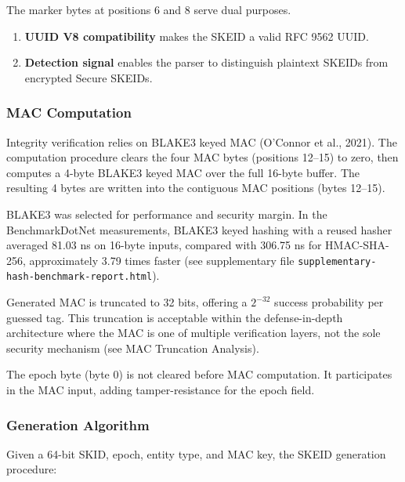 \documentclass[fleqn,10pt]{wlpeerj}
\providecommand{\tightlist}{%
  \setlength{\itemsep}{0pt}\setlength{\parskip}{0pt}}
\begin{document}
The marker bytes at positions 6 and 8 serve dual purposes.

\begin{enumerate}
\def\labelenumi{\arabic{enumi}.}
\tightlist
\item
  \textbf{UUID V8 compatibility} makes the SKEID a valid RFC 9562 UUID.
\item
  \textbf{Detection signal} enables the parser to distinguish plaintext
  SKEIDs from encrypted Secure SKEIDs.
\end{enumerate}

\subsubsection{MAC Computation}\label{mac-computation}

Integrity verification relies on BLAKE3 keyed MAC (O'Connor et al.,
2021). The computation procedure clears the four MAC bytes (positions
12--15) to zero, then computes a 4-byte BLAKE3 keyed MAC over the full
16-byte buffer. The resulting 4 bytes are written into the contiguous
MAC positions (bytes 12--15).

BLAKE3 was selected for performance and security margin. In the
BenchmarkDotNet measurements, BLAKE3 keyed hashing with a reused hasher
averaged 81.03 ns on 16-byte inputs, compared with 306.75 ns for
HMAC-SHA-256, approximately 3.79 times faster (see supplementary file
\texttt{supplementary-hash-benchmark-report.html}).

Generated MAC is truncated to 32 bits, offering a \(2^{-32}\) success
probability per guessed tag. This truncation is acceptable within the
defense-in-depth architecture where the MAC is one of multiple
verification layers, not the sole security mechanism (see MAC Truncation
Analysis).

The epoch byte (byte 0) is not cleared before MAC computation. It
participates in the MAC input, adding tamper-resistance for the epoch
field.

\subsubsection{Generation Algorithm}\label{generation-algorithm-1}

Given a 64-bit SKID, epoch, entity type, and MAC key, the SKEID
generation procedure:
\end{document}
